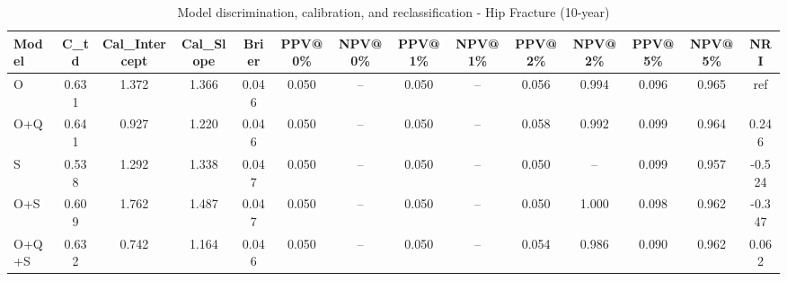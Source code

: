 \begin{table}[htbp]
\centering
\small
\caption{Model discrimination, calibration, and reclassification - Hip Fracture (10-year)}
\label{tab:perf_pd_10y}
\begin{tabular}{lccccccccccccc}
\toprule
Model & C\_td & Cal\_Intercept & Cal\_Slope & Brier & PPV@0\% & NPV@0\% & PPV@1\% & NPV@1\% & PPV@2\% & NPV@2\% & PPV@5\% & NPV@5\% & NRI \\
\midrule
O & 0.631 & 1.372 & 1.366 & 0.046 & 0.050 & -- & 0.050 & -- & 0.056 & 0.994 & 0.096 & 0.965 & ref \\
O+Q & 0.641 & 0.927 & 1.220 & 0.046 & 0.050 & -- & 0.050 & -- & 0.058 & 0.992 & 0.099 & 0.964 & 0.246 \\
S & 0.538 & 1.292 & 1.338 & 0.047 & 0.050 & -- & 0.050 & -- & 0.050 & -- & 0.099 & 0.957 & -0.524 \\
O+S & 0.609 & 1.762 & 1.487 & 0.047 & 0.050 & -- & 0.050 & -- & 0.050 & 1.000 & 0.098 & 0.962 & -0.347 \\
O+Q+S & 0.632 & 0.742 & 1.164 & 0.046 & 0.050 & -- & 0.050 & -- & 0.054 & 0.986 & 0.090 & 0.962 & 0.062 \\
\bottomrule
\end{tabular}
\end{table}